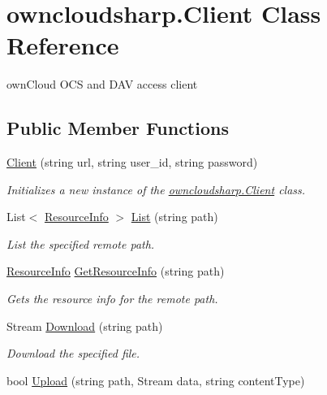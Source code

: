 \hypertarget{classowncloudsharp_1_1_client}{}\section{owncloudsharp.\+Client Class Reference}
\label{classowncloudsharp_1_1_client}


own\+Cloud O\+C\+S and D\+A\+V access client  


\subsection*{Public Member Functions}
\begin{DoxyCompactItemize}
\item 
\hyperlink{classowncloudsharp_1_1_client_a67d23283e5c2cfb84a2c170888992f19}{Client} (string url, string user\+\_\+id, string password)
\begin{DoxyCompactList}\small\item\em Initializes a new instance of the \hyperlink{classowncloudsharp_1_1_client}{owncloudsharp.\+Client} class. \end{DoxyCompactList}\item 
List$<$ \hyperlink{classowncloudsharp_1_1_types_1_1_resource_info}{Resource\+Info} $>$ \hyperlink{classowncloudsharp_1_1_client_a914c144ebbe207958829523f7eda3609}{List} (string path)
\begin{DoxyCompactList}\small\item\em List the specified remote path. \end{DoxyCompactList}\item 
\hyperlink{classowncloudsharp_1_1_types_1_1_resource_info}{Resource\+Info} \hyperlink{classowncloudsharp_1_1_client_aa482194c404ccba36a4095b513c4cf7a}{Get\+Resource\+Info} (string path)
\begin{DoxyCompactList}\small\item\em Gets the resource info for the remote path. \end{DoxyCompactList}\item 
Stream \hyperlink{classowncloudsharp_1_1_client_a3a71b182537b36e924e7df1ae3bbac89}{Download} (string path)
\begin{DoxyCompactList}\small\item\em Download the specified file. \end{DoxyCompactList}\item 
bool \hyperlink{classowncloudsharp_1_1_client_a17ce25a3959149a647f91340be7b3f8d}{Upload} (string path, Stream data, string content\+Type)

\end{DoxyCompactItemize}
